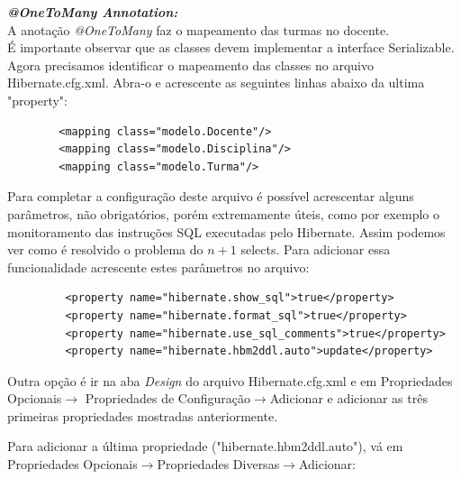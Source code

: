 \documentclass[12pt,a4paper]{article}
\begin{document}
\textit{\textbf{@OneToMany Annotation:}}\\
A anotação \textit{@OneToMany} faz o mapeamento das turmas no docente.\\

É importante observar que as classes devem implementar a interface Serializable.
Agora precisamos identificar o mapeamento das classes no arquivo Hibernate.cfg.xml. Abra-o e acrescente as seguintes linhas abaixo da ultima "property":

\begin{lstlisting}
 		<mapping class="modelo.Docente"/>
        <mapping class="modelo.Disciplina"/>
        <mapping class="modelo.Turma"/>
\end{lstlisting}

Para completar a configuração deste arquivo é possível acrescentar alguns parâmetros, não obrigatórios, porém extremamente úteis, como por exemplo o monitoramento das instruções SQL executadas pelo Hibernate. Assim podemos ver como é resolvido o problema do $n+1$ selects. Para adicionar essa funcionalidade acrescente estes parâmetros no arquivo:
\begin{lstlisting}
		 <property name="hibernate.show_sql">true</property>
		 <property name="hibernate.format_sql">true</property>
		 <property name="hibernate.use_sql_comments">true</property>
		 <property name="hibernate.hbm2ddl.auto">update</property>
\end{lstlisting}


Outra opção é ir na aba \textit{Design} do arquivo Hibernate.cfg.xml e em Propriedades Opcionais$\rightarrow$ Propriedades de Configuração$\rightarrow$Adicionar e adicionar as três primeiras propriedades mostradas anteriormente. 


Para adicionar a última propriedade ("hibernate.hbm2ddl.auto"), vá em Propriedades Opcionais$\rightarrow$Propriedades Diversas$\rightarrow$Adicionar:
\end{document}
